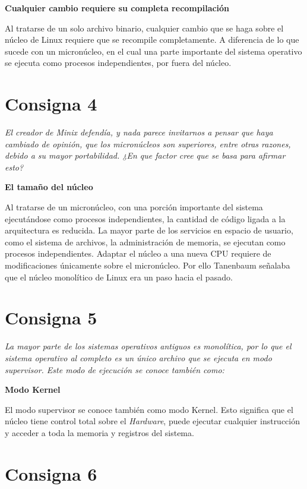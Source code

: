 \documentclass[11pt]{article}
\begin{document}
\textbf{Cualquier cambio requiere su completa recompilación}

Al tratarse de un solo archivo binario, cualquier cambio que se haga sobre el 
núcleo de Linux requiere que se recompile completamente. A diferencia de lo que 
sucede con un micronúcleo, en el cual una parte importante del sistema operativo 
se ejecuta como procesos independientes, por fuera del núcleo.

\section*{Consigna 4}

\emph{El creador de Minix defendía, y nada parece invitarnos a pensar que haya
cambiado de opinión, que los micronúcleos son superiores, entre otras razones,
debido a su mayor portabilidad. ¿En que factor cree que se basa para afirmar
esto?}

\textbf{El tamaño del núcleo}

Al tratarse de un micronúcleo, con una porción importante del sistema
ejecutándose como procesos independientes, la cantidad de código ligada a la 
arquitectura es reducida. La mayor parte de los servicios en espacio de usuario,
como el sistema de archivos, la administración de memoria, se ejecutan como 
procesos independientes. Adaptar el núcleo a una nueva CPU requiere de
modificaciones únicamente sobre el micronúcleo. Por ello Tanenbaum señalaba que 
el núcleo monolítico de Linux era un paso hacia el pasado.

\section*{Consigna 5}

\emph{La mayor parte de los sistemas operativos antiguos es monolítica, por lo
que el sistema operativo al completo es un único archivo que se ejecuta en modo
supervisor. Este modo de ejecución se conoce también como:}

\textbf{Modo Kernel}

El modo supervisor se conoce también como modo Kernel. Esto significa que el 
núcleo tiene control total sobre el \emph{Hardware}, puede ejecutar cualquier 
instrucción y acceder a toda la memoria y registros del sistema.

\section*{Consigna 6}
\end{document}
